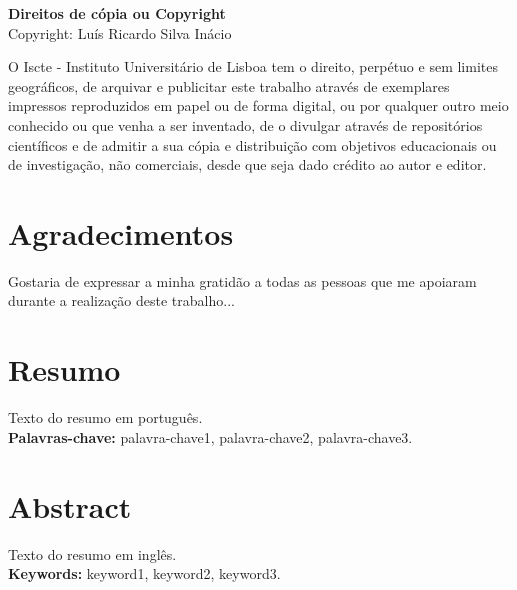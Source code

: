 \documentclass[a4paper,12pt]{report}
\begin{document}
	\newpage
	\thispagestyle{empty}
	\noindent
	{\footnotesize %
		\textbf{Direitos de cópia ou Copyright} \\ \textcopyright
		Copyright: Luís Ricardo Silva Inácio \\[-0.5cm] %
		\begin{flushleft} %
			\renewcommand{\baselinestretch}{1}\selectfont %
			\justify %
			O Iscte - Instituto Universitário de Lisboa tem o direito, perpétuo e sem limites geográficos, de arquivar e publicitar este trabalho através de exemplares impressos reproduzidos em papel ou de forma digital, ou por qualquer outro meio conhecido ou que venha a ser inventado, de o divulgar através de repositórios científicos e de admitir a sua cópia e distribuição com objetivos educacionais ou de investigação, não comerciais, desde que seja dado crédito ao autor e editor.
		\end{flushleft}
	}
	\newpage
	
	\chapter*{Agradecimentos}
	Gostaria de expressar a minha gratidão a todas as pessoas que me apoiaram durante a realização deste trabalho...
	
	\newpage
	\chapter*{Resumo}
	Texto do resumo em português. \\[1em]
	\textbf{Palavras-chave:} palavra-chave1, palavra-chave2, palavra-chave3.
	\newpage
	
	\chapter*{Abstract}
	Texto do resumo em inglês. \\[1em]
	\textbf{Keywords:} keyword1, keyword2, keyword3.
	\newpage
	
	\tableofcontents
	\newpage
	\listoffigures
	\newpage
	\listoftables
	\newpage
	
\end{document}
